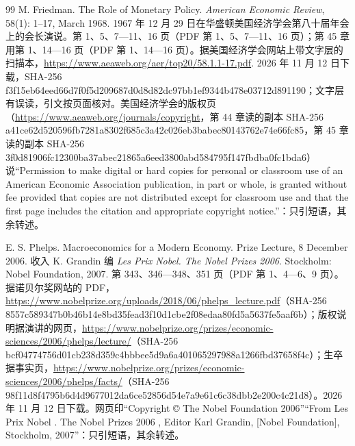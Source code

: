 \begin{thebibliography}{99}
 M. Friedman. The Role of Monetary Policy. \emph{American Economic Review}, 58(1): 1--17, March 1968. 1967 年 12 月 29 日在华盛顿美国经济学会第八十届年会上的会长演说。第 1、5、7—11、16 页（PDF 第 1、5、7—11、16 页）；第 45 章用第 1、14—16 页（PDF 第 1、14—16 页）。据美国经济学会网站上带文字层的扫描本，\url{https://www.aeaweb.org/aer/top20/58.1.1-17.pdf}. 2026 年 11 月 12 日下载，SHA-256 f3f15eb64eed66d7f0f5d209687d0d8d82dc97bb1ef9344b478e03712d891190；文字层有误读，引文按页面核对。美国经济学会的版权页（\url{https://www.aeaweb.org/journals/copyright}，第 44 章读的副本 SHA-256 a41ce62d520596fb7281a8302f685c3a42c026eb3babec80143762e74e66fc85，第 45 章读的副本 SHA-256 3f0d81906fc12300ba37abec21865a6eed3800abd584795f147fbdba0fc1bda6）说“Permission to make digital or hard copies for personal or classroom use of an American Economic Association publication, in part or whole, is granted without fee provided that copies are not distributed except for classroom use and that the first page includes the citation and appropriate copyright notice.”：只引短语，其余转述。

 E. S. Phelps. Macroeconomics for a Modern Economy. Prize Lecture, 8 December 2006. 收入 K. Grandin 编 \emph{Les Prix Nobel. The Nobel Prizes 2006}. Stockholm: Nobel Foundation, 2007. 第 343、346—348、351 页（PDF 第 1、4—6、9 页）。据诺贝尔奖网站的 PDF，\url{https://www.nobelprize.org/uploads/2018/06/phelps_lecture.pdf}（SHA-256 8557c589347b0b46b14e8bd35fead3f10d1cbe2f08edaa80fd5a5637fe5aaf6b）；版权说明据演讲的网页，\url{https://www.nobelprize.org/prizes/economic-sciences/2006/phelps/lecture/}（SHA-256 bcf04774756d01cb238d359c4bbbee5d9a6a401065297988a1266fbd37658f4c）；生卒据事实页，\url{https://www.nobelprize.org/prizes/economic-sciences/2006/phelps/facts/}（SHA-256 98f11d8f4795b6d4d9677012da6ce52856d54e7a9e61c6c38dbb2e200c4c21d8）。2026 年 11 月 12 日下载。网页印“Copyright © The Nobel Foundation 2006”“From Les Prix Nobel . The Nobel Prizes 2006 , Editor Karl Grandin, [Nobel Foundation], Stockholm, 2007”：只引短语，其余转述。


\end{thebibliography}
